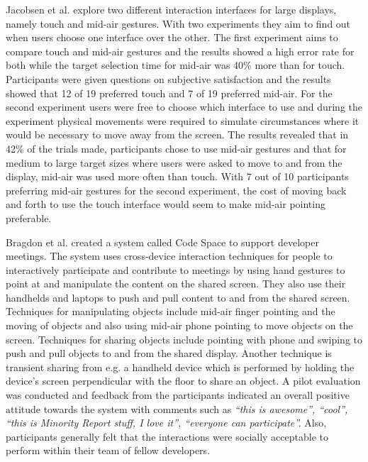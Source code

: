 Jacobsen et al. \cite{Jakobsen:2015} explore two different interaction interfaces for large displays, namely touch and mid-air gestures.
With two experiments they aim to find out when users choose one interface over the other.
The first experiment aims to compare touch and mid-air gestures and the results showed a high error rate for both while the target selection time for mid-air was 40\% more than for touch.
Participants were given questions on subjective satisfaction and the results showed that 12 of 19 preferred touch and 7 of 19 preferred mid-air.
For the second experiment users were free to choose which interface to use and during the experiment physical movements were required to simulate circumstances where it would be necessary to move away from the screen.
The results revealed that in 42\% of the trials made, participants chose to use mid-air gestures and that for medium to large target sizes where users were asked to move to and from the display, mid-air was used more often than touch.
With 7 out of 10 participants preferring mid-air gestures for the second experiment, the cost of moving back and forth to use the touch interface would seem to make mid-air pointing preferable.

Bragdon et al. \cite{Bragdon:2011} created a system called Code Space to support developer meetings.
The system uses cross-device interaction techniques for people to interactively participate and contribute to meetings by using hand gestures to point at and manipulate the content on the shared screen.
They also use their handhelds and laptops to push and pull content to and from the shared screen.
Techniques for manipulating objects include mid-air finger pointing and the moving of objects and also using mid-air phone pointing to move objects on the screen.
Techniques for sharing objects include pointing with phone and swiping to push and pull objects to and from the shared display.
Another technique is transient sharing from e.g. a handheld device which is performed by holding the device's screen perpendicular with the floor to share an object.
A pilot evaluation was conducted and feedback from the participants indicated an overall positive attitude towards the system with comments such as \textit{``this is awesome'', ``cool'', ``this is Minority Report stuff, I love it'', ``everyone can participate''.}
Also, participants generally felt that the interactions were socially acceptable to perform within their team of fellow developers.

